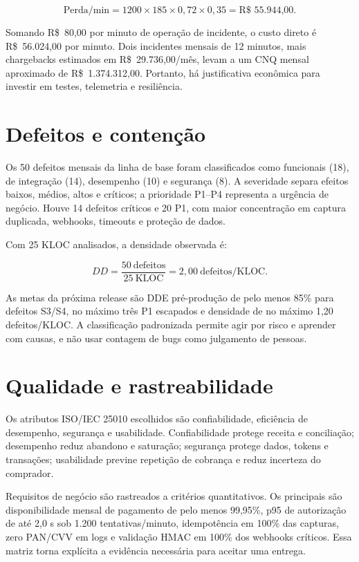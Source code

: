\documentclass[12pt,openright,oneside,a4paper,brazil]{abntex2}
\begin{document}
\begin{equation}
  \text{Perda/min} = 1200 \times 185 \times 0{,}72 \times 0{,}35 = \text{R\$~55.944,00}.
\end{equation}

Somando R\$~80,00 por minuto de operação de incidente, o custo direto é R\$~56.024,00 por minuto. Dois incidentes mensais de 12 minutos, mais chargebacks estimados em R\$~29.736,00/mês, levam a um CNQ mensal aproximado de R\$~1.374.312,00. Portanto, há justificativa econômica para investir em testes, telemetria e resiliência.

\section{Defeitos e contenção}

Os 50 defeitos mensais da linha de base foram classificados como funcionais (18), de integração (14), desempenho (10) e segurança (8). A severidade separa efeitos baixos, médios, altos e críticos; a prioridade P1--P4 representa a urgência de negócio. Houve 14 defeitos críticos e 20 P1, com maior concentração em captura duplicada, webhooks, timeouts e proteção de dados.

Com 25 KLOC analisados, a densidade observada é:

\begin{equation}
  DD = \frac{50\ \text{defeitos}}{25\ \text{KLOC}} = 2{,}00\ \text{defeitos/KLOC}.
\end{equation}

As metas da próxima release são DDE pré-produção de pelo menos 85\% para defeitos S3/S4, no máximo três P1 escapados e densidade de no máximo 1,20 defeitos/KLOC. A classificação padronizada permite agir por risco e aprender com causas, e não usar contagem de bugs como julgamento de pessoas.

\section{Qualidade e rastreabilidade}

Os atributos ISO/IEC 25010 escolhidos são confiabilidade, eficiência de desempenho, segurança e usabilidade. Confiabilidade protege receita e conciliação; desempenho reduz abandono e saturação; segurança protege dados, tokens e transações; usabilidade previne repetição de cobrança e reduz incerteza do comprador.

Requisitos de negócio são rastreados a critérios quantitativos. Os principais são disponibilidade mensal de pagamento de pelo menos 99,95\%, p95 de autorização de até 2,0 s sob 1.200 tentativas/minuto, idempotência em 100\% das capturas, zero PAN/CVV em logs e validação HMAC em 100\% dos webhooks críticos. Essa matriz torna explícita a evidência necessária para aceitar uma entrega.
\end{document}
